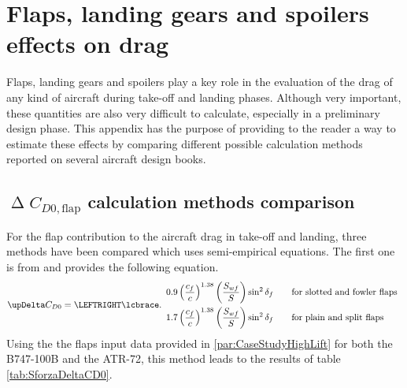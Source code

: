 %
%
\chapter{Flaps, landing gears and spoilers effects on drag}
\label{ch:DeltaCD0FlapSpoiler}
%
\noindent
Flaps, landing gears and spoilers play a key role in the evaluation of the drag of any kind of aircraft during take-off and landing phases. Although very important, these quantities are also very difficult to calculate, especially in a preliminary design phase. This appendix has the purpose of providing to the reader a way to estimate these effects by comparing different possible calculation methods reported on several aircraft design books. 
%
%
\section{$\upDelta C_{D0,\text{flap}}$ calculation methods comparison}\label{par:DeltaCD0FlapComparison}
For the flap contribution to the aircraft drag in take-off and landing, three methods have been compared which uses semi-empirical equations. The first one is from \cite{sforza2014commercial} and provides the following equation.
%
\begin{equation}\label{eq:SforzaCD0}
\upDelta C_{D0}=
    \LEFTRIGHT\lcbrace.{
      \begin{array}{l@{\rule{2em}{0pt}}l} 
        0.9\left(\dfrac{c_f}{c}\right)^{1.38}\left(\dfrac{S_{wf}}{S}\right)\sin^2\delta_f
          & \text{for slotted and fowler flaps}
        \\[1em]
	1.7\left(\dfrac{c_f}{c}\right)^{1.38}\left(\dfrac{S_{wf}}{S}\right)\sin^2\delta_f
          & \text{for plain and split flaps}
      \end{array}
    }  
\end{equation}
%
Using the the flaps input data provided in \ref{par:CaseStudyHighLift} for both the B747-100B and the ATR-72, this method leads to the results of table \ref{tab:SforzaDeltaCD0}.

